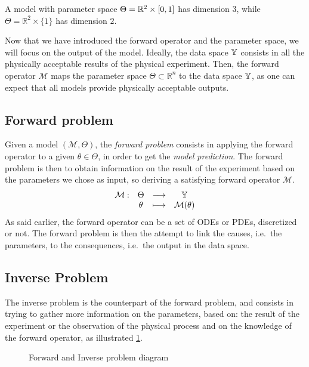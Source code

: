 \documentclass[../../Main_ManuscritThese.tex]{subfiles}
\newcommand\imgpath{/home/victor/acadwriting/Manuscrit/Text/Chapter2/img/}
\begin{document}
\begin{example}
  A model with parameter space $\Theta = \mathbb{R}^2\times \interval{0}{1}$ has dimension $3$, while $\Theta = \mathbb{R}^2 \times \{1\}$ has dimension $2$.
\end{example}
Now that we have introduced the forward operator and the parameter
space, we will focus on the output of the model.  Ideally, the data
space $\mathbb{Y}$ consists in all the physically acceptable results of
the physical experiment.  Then, the forward operator $\mathcal{M}$
maps the parameter space $\Theta \subset \mathbb{R}^{n}$ to the data
space $\mathbb{Y}$, as one can expect that all models provide physically
acceptable outputs.

\subsection{Forward problem}
Given a model $(\mathcal{M}, \Theta)$, the \emph{forward problem}
consists in applying the forward operator to a given
$\theta \in \Theta$, in order to get the \emph{model prediction}. The
forward problem is then to obtain information on the result of the
experiment based on the parameters we chose as input, so deriving a
satisfying forward operator $\mathcal{M}$.
\begin{equation}
  \begin{array}{cccc}
    \mathcal{M}:& \Theta &\longrightarrow & \mathbb{Y} \\
                & \theta &\longmapsto     & \mathcal{M}(\theta)
  \end{array}
\end{equation}
As said earlier, the forward operator can be a set of ODEs or PDEs,
discretized or not. The forward problem is then the attempt to link
the causes, i.e.\ the parameters, to the consequences, i.e.\ the
output in the data space.

\subsection{Inverse Problem}
The inverse problem is the counterpart of the forward problem, and
consists in trying to gather more information on the parameters, based
on: the result of the experiment or the observation of the physical
process and on the knowledge of the forward operator, as illustrated
\cref{fig:inv_problem_pple}.

\begin{figure}[ht]
  \centering
  
  \caption{Forward and Inverse problem diagram}
  \label{fig:inv_problem_pple}
\end{figure}
\end{document}
